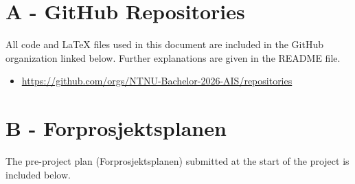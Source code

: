\chapter*{A - GitHub Repositories}

All code and \LaTeX{} files used in this document are included in the GitHub organization linked below. Further explanations are given in the README file.

\begin{itemize}
    \item \url{https://github.com/orgs/NTNU-Bachelor-2026-AIS/repositories}
\end{itemize}

\cleardoublepage

\chapter*{B - Forprosjektsplanen}

The pre-project plan (Forprosjektsplanen) submitted at the start of the project is included below.



